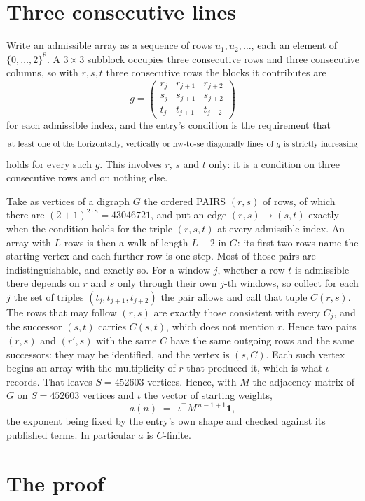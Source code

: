 \documentclass[11pt,a4paper]{article}
\theoremstyle{plain}
\theoremstyle{definition}
\begin{document}
\section{Three consecutive lines}

Write an admissible array as a sequence of rows $u_1,u_2,\dots$, each an element of
$\{0,\dots,2\}^{8}$. A $3\times3$ subblock occupies three consecutive rows and
three consecutive columns, so with $r,s,t$ three consecutive rows the blocks it
contributes are
\[
g=\begin{pmatrix}r_j&r_{j+1}&r_{j+2}\\ s_j&s_{j+1}&s_{j+2}\\ t_j&t_{j+1}&t_{j+2}\end{pmatrix}
\]
for each admissible index, and the entry's condition is the requirement that
\[
\text{at least one}\text{ of the horizontally, vertically or nw-to-se diagonally lines of }g\text{ \text{is strictly increasing}}
\]
holds for every such $g$. This involves $r$, $s$ and $t$ only: it is a condition on
three consecutive rows and on nothing else.

Take as vertices of a digraph $G$ the ordered PAIRS $(r,s)$ of rows, of which there are
$(2+1)^{2\cdot8}=43046721$, and put an edge $(r,s)\to(s,t)$ exactly when the condition
holds for the triple $(r,s,t)$ at every admissible index. An array with $L$ rows is then a
walk of length $L-2$ in $G$: its first two rows name the starting vertex and each further
row is one step. Most of those pairs are indistinguishable, and exactly so. For a window $j$, whether a row $t$ is admissible there depends on $r$ and $s$ only through their own $j$-th windows, so collect for each $j$ the set of triples $(t_j,t_{j+1},t_{j+2})$ the pair allows and call that tuple $C(r,s)$. The rows that may follow $(r,s)$ are exactly those consistent with every $C_j$, and the successor $(s,t)$ carries $C(s,t)$, which does not mention $r$. Hence two pairs $(r,s)$ and $(r',s)$ with the same $C$ have the same outgoing rows and the same successors: they may be identified, and the vertex is $(s,C)$. Each such vertex begins an array with the multiplicity of $r$ that produced it, which is what $\iota$ records. That leaves $S=452603$ vertices. Hence, with $M$ the adjacency matrix of $G$ on $S=452603$ vertices and
$\iota$ the vector of starting weights,
\[
a(n)\;=\;\,\iota^{\!\top}M^{\,n-1+1}\mathbf{1},
\]
the exponent being fixed by the entry's own shape and checked against its published terms.
In particular $a$ is $C$-finite.

\section{The proof}
\end{document}

